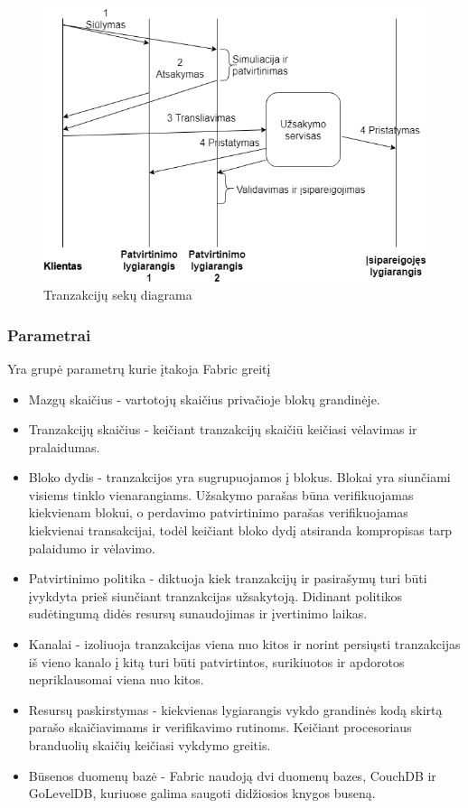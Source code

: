 \documentclass{VUMIFPSkursinis}
\begin{document}
			\begin{figure}[H]
			    \centering
			    \includegraphics[scale=0.5]{img/MLP}
			    \caption{Tranzakcijų sekų diagrama}   %
			    \label{img:mlp}
			\end{figure}
		\subsubsection{Parametrai}
			Yra grupė parametrų \cite{IMBResearch} kurie įtakoja Fabric greitį 
			
			\begin{itemize}
				\item{Mazgų skaičius - vartotojų skaičius privačioje blokų grandinėje.}
				\item{Tranzakcijų skaičius - keičiant tranzakcijų skaičiū keičiasi vėlavimas ir pralaidumas.}
				\item{Bloko dydis - tranzakcijos yra sugrupuojamos į blokus. Blokai yra siunčiami visiems tinklo vienarangiams. Užsakymo parašas 
būna verifikuojamas kiekvienam blokui, o perdavimo patvirtinimo parašas verifikuojamas kiekvienai transakcijai, todėl keičiant bloko dydį atsiranda kompropisas tarp palaidumo ir vėlavimo.}
				\item{Patvirtinimo politika - diktuoja kiek tranzakcijų ir pasirašymų turi būti įvykdyta prieš siunčiant tranzakcijas užsakytoją. Didinant politikos sudėtingumą didės resursų sunaudojimas ir įvertinimo laikas.}
				\item{Kanalai - izoliuoja tranzakcijas viena nuo kitos ir norint persiųsti tranzakcijas iš vieno kanalo į kitą turi būti patvirtintos, surikiuotos ir apdorotos nepriklausomai viena nuo kitos.}
				\item{Resursų paskirstymas - kiekvienas lygiarangis vykdo grandinės kodą skirtą parašo skaičiavimams ir verifikavimo rutinoms. Keičiant procesoriaus branduolių skaičių keičiasi vykdymo greitis.}
				\item{Būsenos duomenų bazė - Fabric naudoją dvi duomenų bazes, CouchDB ir GoLevelDB, kuriuose galima saugoti didžiosios knygos buseną.}
			\end{itemize}
\end{document}
